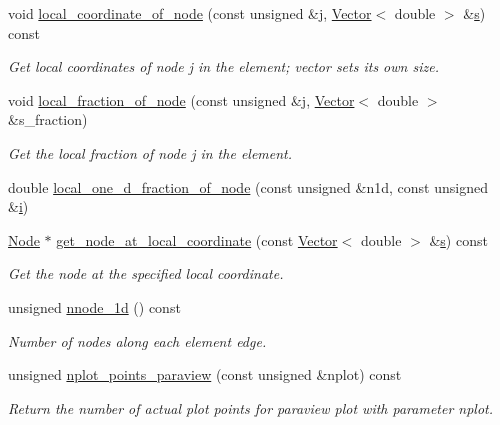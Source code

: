 \begin{DoxyCompactItemize}
void \hyperlink{classoomph_1_1QElement_3_011_00_01NNODE__1D_01_4_add66ba0e7f67f51959273a56faf1c9ae}{local\+\_\+coordinate\+\_\+of\+\_\+node} (const unsigned \&j, \hyperlink{classoomph_1_1Vector}{Vector}$<$ double $>$ \&\hyperlink{cfortran_8h_ab7123126e4885ef647dd9c6e3807a21c}{s}) const
\begin{DoxyCompactList}\small\item\em Get local coordinates of node j in the element; vector sets its own size. \end{DoxyCompactList}\item 
void \hyperlink{classoomph_1_1QElement_3_011_00_01NNODE__1D_01_4_a3b67e66f9987f60b4e497af099e163c0}{local\+\_\+fraction\+\_\+of\+\_\+node} (const unsigned \&j, \hyperlink{classoomph_1_1Vector}{Vector}$<$ double $>$ \&s\+\_\+fraction)
\begin{DoxyCompactList}\small\item\em Get the local fraction of node j in the element. \end{DoxyCompactList}\item 
double \hyperlink{classoomph_1_1QElement_3_011_00_01NNODE__1D_01_4_ab3a43b3caceeadfda93a7a50740a9154}{local\+\_\+one\+\_\+d\+\_\+fraction\+\_\+of\+\_\+node} (const unsigned \&n1d, const unsigned \&\hyperlink{cfortran_8h_adb50e893b86b3e55e751a42eab3cba82}{i})
\item 
\hyperlink{classoomph_1_1Node}{Node} $\ast$ \hyperlink{classoomph_1_1QElement_3_011_00_01NNODE__1D_01_4_a76e18de2ca567ae669f097524b92288f}{get\+\_\+node\+\_\+at\+\_\+local\+\_\+coordinate} (const \hyperlink{classoomph_1_1Vector}{Vector}$<$ double $>$ \&\hyperlink{cfortran_8h_ab7123126e4885ef647dd9c6e3807a21c}{s}) const
\begin{DoxyCompactList}\small\item\em Get the node at the specified local coordinate. \end{DoxyCompactList}\item 
unsigned \hyperlink{classoomph_1_1QElement_3_011_00_01NNODE__1D_01_4_aa37c4b1c77e3799a64667676ca445eb2}{nnode\+\_\+1d} () const
\begin{DoxyCompactList}\small\item\em Number of nodes along each element edge. \end{DoxyCompactList}\item 
unsigned \hyperlink{classoomph_1_1QElement_3_011_00_01NNODE__1D_01_4_a78c29fc6ff2fa0651a65b7d3e300cb7f}{nplot\+\_\+points\+\_\+paraview} (const unsigned \&nplot) const
\begin{DoxyCompactList}\small\item\em Return the number of actual plot points for paraview plot with parameter nplot. \end{DoxyCompactList}\item 

\end{DoxyCompactItemize}
